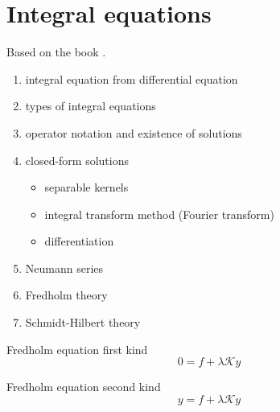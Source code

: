 \documentclass[../main/main.tex]{subfiles}
\begin{document}
\newpage
\section{Integral equations}
Based on the book \cite{Mmfp}.
\begin{enumerate}
\item integral equation from differential equation
\item types of integral equations
\item operator notation and existence of solutions
\item closed-form solutions
\begin{itemize}
\item separable kernels
\item integral transform method (Fourier transform)
\item differentiation
\end{itemize}

\item Neumann series
\item Fredholm theory
\item Schmidt-Hilbert theory
\end{enumerate}

Fredholm equation first kind
\begin{equation}
0 = f + \lambda \mathcal{K}y
\end{equation}

Fredholm equation second kind
\begin{equation}
y = f + \lambda \mathcal{K}y
\end{equation}
\end{document}
